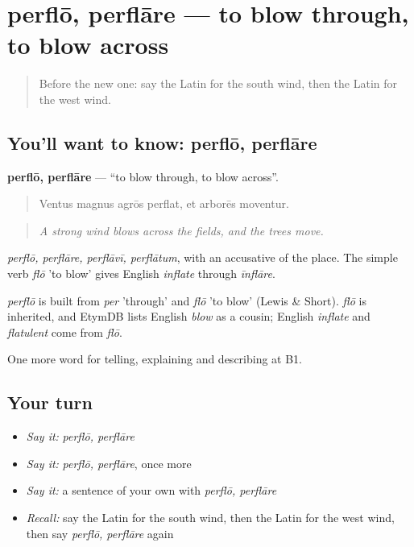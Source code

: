 \section[perflō, perflāre]{perflō, perflāre — to blow through, to blow across}

\label{lesson:LA-C487-perflo}



\begin{quote}
Before the new one: say the Latin for the south wind, then the Latin for the west wind.
\end{quote}

\subsection*{You'll want to know: perflō, perflāre}
\textbf{perflō, perflāre} — \textquotedblleft{}to blow through, to blow across\textquotedblright{}.

\begin{quote}
Ventus magnus agrōs perflat, et arborēs moventur.
\end{quote}

\begin{quote}
\emph{A strong wind blows across the fields, and the trees move.}
\end{quote}

\emph{perflō, perflāre, perflāvī, perflātum}, with an accusative of the place. The simple verb \emph{flō} 'to blow' gives English \emph{inflate} through \emph{īnflāre}.

\begin{cousinweb}
\emph{perflō} is built from \emph{per} 'through' and \emph{flō} 'to blow' (Lewis \& Short). \emph{flō} is inherited, and EtymDB lists English \emph{blow} as a cousin; English \emph{inflate} and \emph{flatulent} come from \emph{flō}.
\end{cousinweb}

\begin{grammarlens}[title={What you've built}]
One more word for telling, explaining and describing at B1.
\end{grammarlens}

\subsection*{Your turn}
\begin{itemize}
\raggedright
  \item \emph{Say it:} \emph{perflō, perflāre}
  \item \emph{Say it:} \emph{perflō, perflāre}, once more
  \item \emph{Say it:} a sentence of your own with \emph{perflō, perflāre}
  \item \emph{Recall:} say the Latin for the south wind, then the Latin for the west wind, then say \emph{perflō, perflāre} again
\end{itemize}

